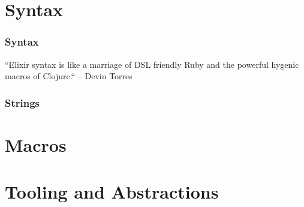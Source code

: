 \documentclass{beamer}
\begin{document}
\section[Section]{Syntax}

\begin{frame}
  \frametitle{Syntax}
  ``Elixir syntax is like a marriage of DSL
  friendly Ruby and the powerful hygenic macros of Clojure.``
  \linebreak
  \textrm{-- Devin Torres}
\end{frame}

\begin{frame}
  \frametitle{Strings}
\end{frame}

\section[Section]{Macros}

\section[Section]{Tooling and Abstractions}
  
\end{document}
